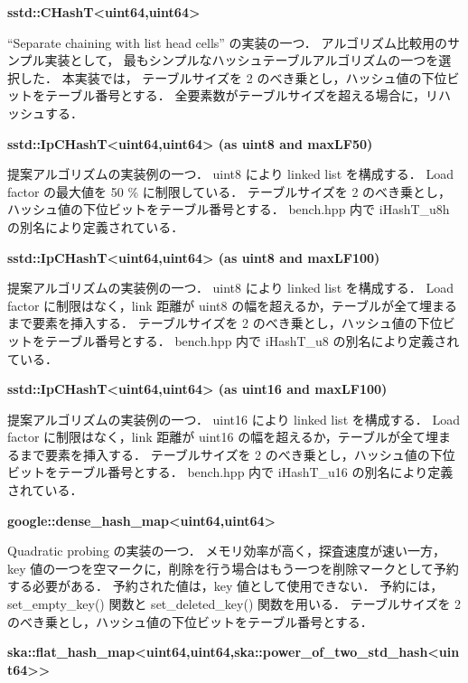 %
{\bf sstd::CHashT<uint64,uint64>}

``Separate chaining with list head cells'' の実装の一つ．
アルゴリズム比較用のサンプル実装として，
最もシンプルなハッシュテーブルアルゴリズムの一つを選択した．
本実装では，
テーブルサイズを 2 のべき乗とし，ハッシュ値の下位ビットをテーブル番号とする．
全要素数がテーブルサイズを超える場合に，リハッシュする．
\leavevmode \newline

%
{\bf sstd::IpCHashT<uint64,uint64> (as uint8 and maxLF50)}

提案アルゴリズムの実装例の一つ．
uint8 により linked list を構成する．
Load factor の最大値を 50 \% に制限している．
テーブルサイズを 2 のべき乗とし，ハッシュ値の下位ビットをテーブル番号とする．
{\rm bench.hpp} 内で {\rm iHashT\_u8h} の別名により定義されている．
\leavevmode \newline

%
{\bf sstd::IpCHashT<uint64,uint64> (as uint8 and maxLF100)}

提案アルゴリズムの実装例の一つ．
uint8 により linked list を構成する．
Load factor に制限はなく，link 距離が uint8 の幅を超えるか，テーブルが全て埋まるまで要素を挿入する．
テーブルサイズを 2 のべき乗とし，ハッシュ値の下位ビットをテーブル番号とする．
{\rm bench.hpp} 内で {\rm iHashT\_u8} の別名により定義されている．
\leavevmode \newline

%
{\bf sstd::IpCHashT<uint64,uint64> (as uint16 and maxLF100)}

提案アルゴリズムの実装例の一つ．
uint16 により linked list を構成する．
Load factor に制限はなく，link 距離が uint16 の幅を超えるか，テーブルが全て埋まるまで要素を挿入する．
テーブルサイズを 2 のべき乗とし，ハッシュ値の下位ビットをテーブル番号とする．
{\rm bench.hpp} 内で {\rm iHashT\_u16} の別名により定義されている．
\leavevmode \newline

%
{\bf google::dense\_hash\_map<uint64,uint64>}

Quadratic probing の実装の一つ．
メモリ効率が高く，探査速度が速い一方，
key 値の一つを空マークに，削除を行う場合はもう一つを削除マークとして予約する必要がある．
予約された値は，key 値として使用できない．
予約には，set\_empty\_key() 関数と set\_deleted\_key() 関数を用いる．
テーブルサイズを 2 のべき乗とし，ハッシュ値の下位ビットをテーブル番号とする．
\leavevmode \newline

%
{\bf ska::flat\_hash\_map<uint64,uint64,ska::power\_of\_two\_std\_hash<uint64>>}

